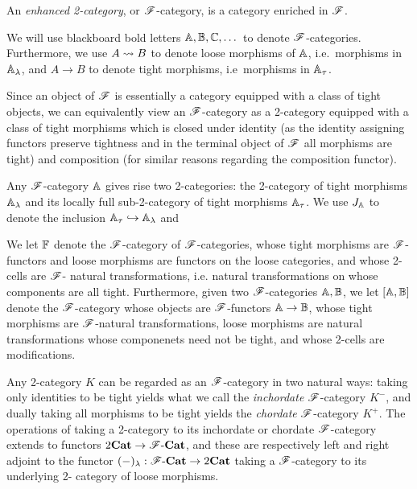 \documentclass[../thesis.tex]{subfiles}
\begin{document}
  \begin{definition}
    An \emph{enhanced 2-category}, or ${\mathscr{F}}$-category, is a category enriched in ${\mathscr{F}}$.
  \end{definition}
  \begin{notation}
    We will use blackboard bold letters ${\mathbb{A}},{\mathbb{B}},{\mathbb{C}},\dots$ to denote ${\mathscr{F}}$-categories. Furthermore,
    we use $A \rightsquigarrow B$ to denote loose morphisms of ${\mathbb{A}}$, i.e.\ morphisms in ${\mathbb{A}}_\lambda$, and
    $A \to B$ to denote tight morphisms, i.e\ morphisms in ${\mathbb{A}}_\tau$.
  \end{notation}
  \begin{remark}
    Since an object of ${\mathscr{F}}$ is essentially a category equipped with a class of tight objects, we
    can equivalently view an ${\mathscr{F}}$-category as a 2-category equipped with a class of tight morphisms
    which is closed under identity (as the identity assigning functors preserve tightness and in the
    terminal object of ${\mathscr{F}}$ all morphisms are tight) and composition (for similar reasons regarding
    the composition functor).
  \end{remark}

  Any ${\mathscr{F}}$-category ${\mathbb{A}}$ gives rise two 2-categories: the 2-category of tight morphisms ${\mathbb{A}}_
  \lambda$ and its locally full sub-2-category of tight morphisms ${\mathbb{A}}_\tau$. We use $J_{\mathbb{A}}$ to
  denote the inclusion ${\mathbb{A}}_\tau \hookrightarrow {\mathbb{A}}_\lambda$ and

  We let ${\mathbb{F}}$ denote the ${\mathscr{F}}$-category of ${\mathscr{F}}$-categories, whose tight morphisms are ${\mathscr{F}}$-%
  functors and loose morphisms are functors on the loose categories, and whose 2-cells are ${\mathscr{F}}$-%
  natural transformations, i.e. natural transformations on whose components are all tight.
  Furthermore, given two ${\mathscr{F}}$-categories ${\mathbb{A}},{\mathbb{B}}$, we let $[{\mathbb{A}},{\mathbb{B}}]$ denote the ${\mathscr{F}}$-category
  whose objects are ${\mathscr{F}}$-functors ${\mathbb{A}} \to {\mathbb{B}}$, whose tight morphisms are ${\mathscr{F}}$-natural
  transformations, loose morphisms are natural transformations whose componenets need not be
  tight, and whose 2-cells are modifications.

  Any 2-category $K$ can be regarded as an ${\mathscr{F}}$-category in two natural ways: taking only
  identities to be tight yields what we call the \emph{inchordate} ${\mathscr{F}}$-category $K^-$, and 
  dually taking all morphisms to be tight yields the \emph{chordate} ${\mathscr{F}}$-category $K^+$. The
  operations of taking a 2-category to its inchordate or chordate ${\mathscr{F}}$-category extends to
  functors $2{\mathbf{Cat}} \to {\mathscr{F}}\text-{\mathbf{Cat}}$, and these are respectively left and right adjoint to the
  functor $(-)_\lambda : {\mathscr{F}}\text-{\mathbf{Cat}} \to 2{\mathbf{Cat}}$ taking a ${\mathscr{F}}$-category to its underlying 2-%
  category of loose morphisms.
\end{document}

